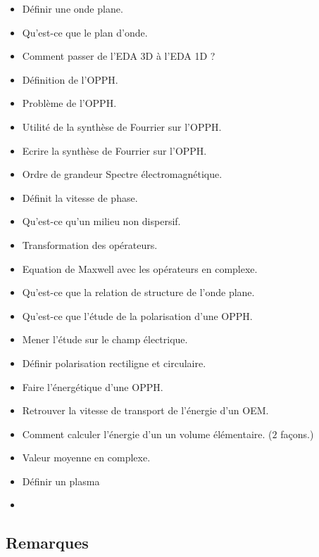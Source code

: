 \documentclass[a4paper, 11pt, hidelinks]{article}
\begin{document}
\begin{itemize}
    \item Définir une onde plane. \cite{Chapitre15}
    \item Qu'est-ce que le plan d'onde. \cite{Chapitre15}
    \item Comment passer de l'EDA 3D à l'EDA 1D ? \cite{Chapitre15}
    \item Définition de l'OPPH. \cite{Chapitre15}
    \item Problème de l'OPPH. \cite{Chapitre15}
    \item Utilité de la synthèse de Fourrier sur l'OPPH. \cite{Chapitre15}
    \item Ecrire la synthèse de Fourrier sur l'OPPH. \cite{Chapitre15}
    \item Ordre de grandeur Spectre électromagnétique. \cite{Chapitre15}
    \item Définit la vitesse de phase. \cite{Chapitre15}
    \item Qu'est-ce qu'un milieu non dispersif. \cite{Chapitre15}
    \item Transformation des opérateurs. \cite{Chapitre15}
    \item Equation de Maxwell avec les opérateurs en complexe. \cite{Chapitre15}
    \item Qu'est-ce que la relation de structure de l'onde plane. \cite{Chapitre15}
    \item Qu'est-ce que l'étude de la polarisation d'une OPPH. \cite{Chapitre15}
    \item Mener l'étude sur le champ électrique. \cite{Chapitre15}
    \item Définir polarisation rectiligne et circulaire. \cite{Chapitre15}
    \item Faire l'énergétique d'une OPPH. \cite{Chapitre15}
    \item Retrouver la vitesse de transport de l'énergie d'un OEM. \cite{Chapitre15}
    \item Comment calculer l'énergie d'un un volume élémentaire. ($2$ façons.) \cite{Chapitre15}
    \item Valeur moyenne en complexe. \cite{Chapitre15}
    \item Définir un plasma \cite{Chapitre16}
    \item 
\end{itemize}


\subsection{Remarques}
\end{document}

